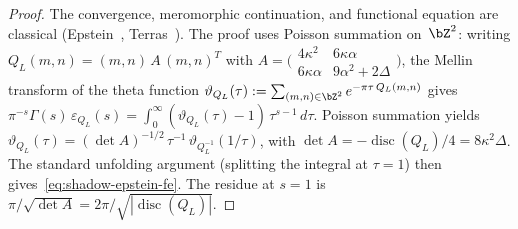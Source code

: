 \begin{proof}
The convergence, meromorphic continuation, and functional
equation are classical
\textup{(}Epstein~\cite{Epstein1903},
Terras~\cite{Terras1973}\textup{)}.
The proof uses Poisson summation on~$\bZ^2$:
writing $Q_L(m,n) = (m,n)\,A\,(m,n)^T$ with
$A = \bigl(\begin{smallmatrix}
  4\kappa^2 & 6\kappa\alpha \\
  6\kappa\alpha & 9\alpha^2 + 2\Delta
\end{smallmatrix}\bigr)$,
the Mellin transform of the theta function
$\vartheta_{Q_L}(\tau) :=
\sum_{(m,n)\in\bZ^2} e^{-\pi\tau\,Q_L(m,n)}$
gives
$\pi^{-s}\Gamma(s)\,\varepsilon_{Q_L}(s)
= \int_0^\infty (\vartheta_{Q_L}(\tau) - 1)\,\tau^{s-1}\,d\tau$.
Poisson summation yields
$\vartheta_{Q_L}(\tau) =
(\det A)^{-1/2}\,\tau^{-1}\,
\vartheta_{Q_L^{-1}}(1/\tau)$,
with $\det A = -\operatorname{disc}(Q_L)/4
= 8\kappa^2\Delta$.
The standard unfolding argument
\textup{(}splitting the integral at $\tau = 1$\textup{)} then
gives~\eqref{eq:shadow-epstein-fe}.
The residue at $s = 1$ is
$\pi/\sqrt{\det A} = 2\pi/\sqrt{|\operatorname{disc}(Q_L)|}$.
\end{proof}

